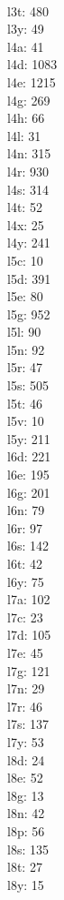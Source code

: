 \begin{multicols}{8}
  \\l3t: 480
  \\l3y: 49
  \\l4a: 41
  \\l4d: 1083
  \\l4e: 1215
  \\l4g: 269
  \\l4h: 66
  \\l4l: 31
  \\l4n: 315
  \\l4r: 930
  \\l4s: 314
  \\l4t: 52
  \\l4x: 25
  \\l4y: 241
  \\l5c: 10
  \\l5d: 391
  \\l5e: 80
  \\l5g: 952
  \\l5l: 90
  \\l5n: 92
  \\l5r: 47
  \\l5s: 505
  \\l5t: 46
  \\l5v: 10
  \\l5y: 211
  \\l6d: 221
  \\l6e: 195
  \\l6g: 201
  \\l6n: 79
  \\l6r: 97
  \\l6s: 142
  \\l6t: 42
  \\l6y: 75
  \\l7a: 102
  \\l7c: 23
  \\l7d: 105
  \\l7e: 45
  \\l7g: 121
  \\l7n: 29
  \\l7r: 46
  \\l7s: 137
  \\l7y: 53
  \\l8d: 24
  \\l8e: 52
  \\l8g: 13
  \\l8n: 42
  \\l8p: 56
  \\l8s: 135
  \\l8t: 27
  \\l8y: 15

\end{multicols}
